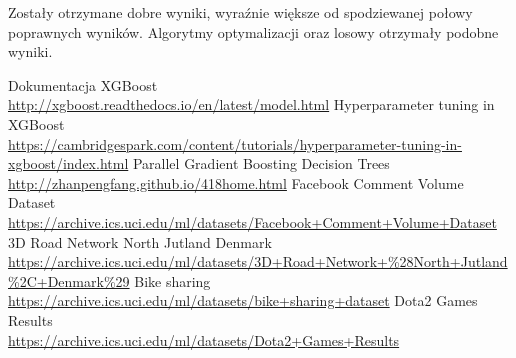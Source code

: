 \documentclass[a4paper,12p]{article}
\begin{document}
	Zostały otrzymane dobre wyniki, wyraźnie większe od spodziewanej połowy poprawnych wyników. Algorytmy optymalizacji oraz losowy otrzymały podobne wyniki.  
	
\begin{thebibliography}{1}
 Dokumentacja XGBoost \\ \url{http://xgboost.readthedocs.io/en/latest/model.html}
 Hyperparameter tuning in XGBoost \\ \url{https://cambridgespark.com/content/tutorials/hyperparameter-tuning-in-xgboost/index.html}
 Parallel Gradient Boosting Decision Trees \\ \url{http://zhanpengfang.github.io/418home.html}
 Facebook Comment Volume Dataset \\ \url{https://archive.ics.uci.edu/ml/datasets/Facebook+Comment+Volume+Dataset}
 3D Road Network North Jutland Denmark \\ \url{https://archive.ics.uci.edu/ml/datasets/3D+Road+Network+%28North+Jutland%2C+Denmark%29}
 Bike sharing \\ \url{https://archive.ics.uci.edu/ml/datasets/bike+sharing+dataset}
 Dota2 Games Results \\ \url{https://archive.ics.uci.edu/ml/datasets/Dota2+Games+Results}

\end{thebibliography}	
	
\end{document}

